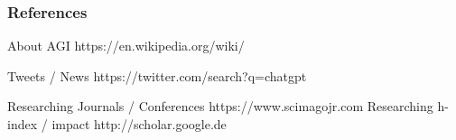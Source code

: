\documentclass[
	11pt, %
]{beamer}
\begin{document}
\begin{frame} %
	\frametitle{References}
	
	\begin{thebibliography}{99} %
		\footnotesize %

			About AGI
			\newblock https://en.wikipedia.org/wiki/
  
			Tweets / News
			\newblock https://twitter.com/search?q=chatgpt

    		Researching Journals / Conferences
    		\newblock https://www.scimagojr.com
    		Researching h-index / impact
            \newblock http://scholar.google.de

	\end{thebibliography}
\end{frame}
\fi

\end{document}
